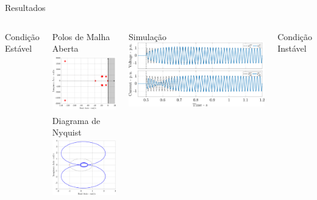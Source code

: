 \begin{frame}{Resultados}


\begin{columns}

\vspace*{-0.1cm}
\centering
{Condição Estável\\[5pt]}


\begin{columns}
\centering
\small
Polos de Malha Aberta
\includegraphics[width=0.80\linewidth, height=2.5cm]{./figuras/aplicacao/poles_ca_estavel}
\centering
\small
Diagrama de Nyquist
\includegraphics[width=0.75\linewidth, height=2.5cm]{./figuras/aplicacao/nyquist_ca_estavel}
\end{columns}
\small 
Simulação
\includegraphics[width=0.96\linewidth]{./figuras/aplicacao/time_resp_ca_estavel}

\vspace*{-0.1cm}
\centering
{Condição Instável\\[5pt]}



\end{columns}
\end{frame}
